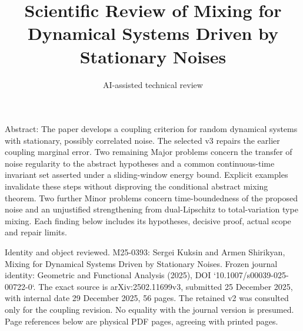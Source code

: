 \documentclass[10pt]{article}
\title{Scientific Review of
Mixing for Dynamical Systems
Driven by Stationary Noises}
\author{AI-assisted technical review}
\date{}
\begin{document}
\maketitle
Abstract: The paper develops a coupling criterion for random dynamical systems with stationary, possibly correlated noise. The selected v3 repairs the earlier coupling marginal error. Two remaining Major problems concern the transfer of noise regularity to the abstract hypotheses and a common continuous-time invariant set asserted under a sliding-window energy bound. Explicit examples invalidate these steps without disproving the conditional abstract mixing theorem. Two further Minor problems concern time-boundedness of the proposed noise and an unjustified strengthening from dual-Lipschitz to total-variation type mixing. Each finding below includes its hypotheses, decisive proof, actual scope and repair limits.\par
Identity and object reviewed. M25-0393: Sergei Kuksin and Armen Shirikyan, Mixing for Dynamical Systems Driven by Stationary Noises. Frozen journal identity: Geometric and Functional Analysis (2025), DOI `10.1007/s00039-025-00722-0`. The exact source is arXiv:2502.11699v3, submitted 25 December 2025, with internal date 29 December 2025, 56 pages. The retained v2 was consulted only for the coupling revision. No equality with the journal version is presumed. Page references below are physical PDF pages, agreeing with printed pages.\par
\end{document}
